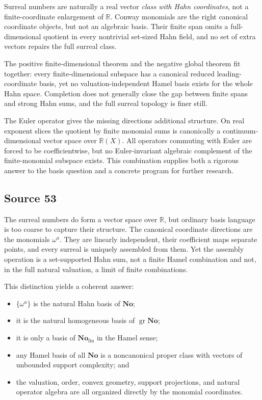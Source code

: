 \documentclass[11pt,letterpaper]{article}
\numberwithin{equation}{section}
\theoremstyle{definition}
\theoremstyle{remark}
\newcommand{\No}{\mathbf{No}}
\newcommand{\R}{\mathbb{R}}
\newcommand{\Fin}{\No_{\mathrm{fin}}}
\newcommand{\gr}{\operatorname{gr}}
\begin{document}
Surreal numbers are naturally a real vector \emph{class with Hahn coordinates}, not a finite-coordinate enlargement of $\R$. Conway monomials are the right canonical coordinate objects, but not an algebraic basis. Their finite span omits a full-dimensional quotient in every nontrivial set-sized Hahn field, and no set of extra vectors repairs the full surreal class.

The positive finite-dimensional theorem and the negative global theorem fit together: every finite-dimensional subspace has a canonical reduced leading-coordinate basis, yet no valuation-independent Hamel basis exists for the whole Hahn space. Completion does not generally close the gap between finite spans and strong Hahn sums, and the full surreal topology is finer still.

The Euler operator gives the missing directions additional structure. On real exponent slices the quotient by finite monomial sums is canonically a continuum-dimensional vector space over $\R(X)$. All operators commuting with Euler are forced to be coefficientwise, but no Euler-invariant algebraic complement of the finite-monomial subspace exists. This combination supplies both a rigorous answer to the basis question and a concrete program for further research.

\subsection{Source 53}

The surreal numbers do form a vector space over $\R$, but ordinary basis language
is too coarse to capture their structure. The canonical coordinate directions are
the monomials $\omega^a$. They are linearly independent, their coefficient maps
separate points, and every surreal is uniquely assembled from them. Yet the assembly
operation is a set-supported Hahn sum, not a finite Hamel combination and not, in
the full natural valuation, a limit of finite combinations.

This distinction yields a coherent answer:
\begin{itemize}
\item $\{\omega^a\}$ is the natural Hahn basis of $\No$;
\item it is the natural homogeneous basis of $\gr\No$;
\item it is only a basis of $\Fin$ in the Hamel sense;
\item any Hamel basis of all $\No$ is a noncanonical proper class with vectors of
unbounded support complexity; and
\item the valuation, order, convex geometry, support projections, and natural
operator algebra are all organized directly by the monomial coordinates.
\end{itemize}
\end{document}

